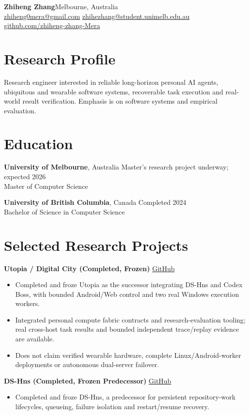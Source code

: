\documentclass[10pt,a4paper]{article}
\begin{document}
{\LARGE\bfseries Zhiheng Zhang}\hfill Melbourne, Australia\\
\href{mailto:zhiheng0mera@gmail.com}{zhiheng0mera@gmail.com}
\quad \href{mailto:zhihezhang@student.unimelb.edu.au}{zhihezhang@student.unimelb.edu.au}\\
\href{https://github.com/zhiheng-zhang-Mera}{github.com/zhiheng-zhang-Mera}

\section{Research Profile}
Research engineer interested in reliable long-horizon personal AI agents, ubiquitous and wearable software systems, recoverable task execution and real-world result verification. Emphasis is on software systems and empirical evaluation.

\section{Education}
\textbf{University of Melbourne}, Australia \hfill Master's research project underway; expected 2026\\
Master of Computer Science

\textbf{University of British Columbia}, Canada \hfill Completed 2024\\
Bachelor of Science in Computer Science

\section{Selected Research Projects}
\textbf{Utopia / Digital City (Completed, Frozen)} \hfill \href{https://github.com/zhiheng-zhang-Mera/utopia}{GitHub}\\
\begin{itemize}
\item Completed and froze Utopia as the successor integrating DS-Hns and Codex Boss, with bounded Android/Web control and two real Windows execution workers.
\item Integrated personal compute fabric contracts and research-evaluation tooling; real cross-host task results and bounded independent trace/replay evidence are available.
\item Does not claim verified wearable hardware, complete Linux/Android-worker deployments or autonomous dual-server failover.
\end{itemize}

\textbf{DS-Hns (Completed, Frozen Predecessor)} \hfill \href{https://github.com/zhiheng-zhang-Mera/DS-Hns}{GitHub}\\
\begin{itemize}
\item Completed and froze DS-Hns, a predecessor for persistent repository-work lifecycles, queueing, failure isolation and restart/resume recovery.
\end{itemize}
\end{document}
